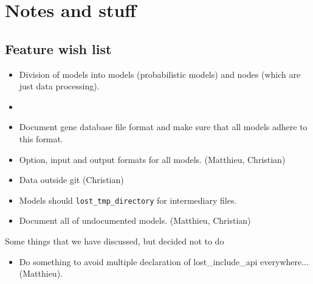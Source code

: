 \documentclass{book}
\begin{document}
\chapter{Notes and stuff}

\section{Feature wish list}

\begin{itemize}

\item Division of models into models (probabilistic models) and nodes
  (which are just data processing).

\item 

\item Document gene database file format and make sure that all models
  adhere to this format.

\item Option, input and output formats for all models. (Matthieu, Christian)

\item Data outside git (Christian)

\item Models should \texttt{lost\_tmp\_directory} for intermediary
  files. 

\item Document all of undocumented models. (Matthieu, Christian)

\end{itemize}

Some things that we have discussed, but  decided not to do
\begin{itemize}
\item Do something to avoid multiple declaration of lost\_include\_api
 everywhere... (Matthieu).
\end{itemize}

\printindex
\end{document}

